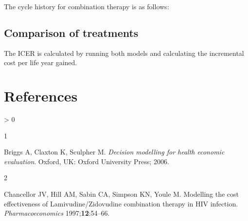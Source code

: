 \documentclass[
]{article}
\newenvironment{Shaded}{\begin{snugshade}}{\end{snugshade}}
\newcommand{\CommentTok}[1]{\textcolor[rgb]{0.56,0.35,0.01}{\textit{#1}}}
\newcommand{\DocumentationTok}[1]{\textcolor[rgb]{0.56,0.35,0.01}{\textbf{\textit{#1}}}}
\newlength{\cslhangindent}
\newlength{\csllabelwidth}
\newenvironment{CSLReferences}[2] %
 {%
  \setlength{\parindent}{0pt}
  \ifodd #1 \everypar{\setlength{\hangindent}{\cslhangindent}}\ignorespaces\fi
  \ifnum #2 > 0
  \setlength{\parskip}{#2\baselineskip}
  \fi
 }%
 {}
\newcommand{\CSLLeftMargin}[1]{\parbox[t]{\csllabelwidth}{#1}}
\newcommand{\CSLRightInline}[1]{\parbox[t]{\linewidth - \csllabelwidth}{#1}\break}
\begin{document}
\begin{Shaded}
\end{Shaded}

The cycle history for combination therapy is as follows:

\hypertarget{comparison-of-treatments}{%
\subsection{Comparison of treatments}\label{comparison-of-treatments}}

The ICER is calculated by running both models and calculating the
incremental cost per life year gained.

\hypertarget{references}{%
\section*{References}\label{references}}

\hypertarget{refs}{}
\begin{CSLReferences}{0}{0}
\leavevmode\hypertarget{ref-briggs2006}{}%
\CSLLeftMargin{1 }
\CSLRightInline{Briggs A, Claxton K, Sculpher M. \emph{Decision
modelling for health economic evaluation}. {Oxford, UK}: {Oxford
University Press}; 2006.}

\leavevmode\hypertarget{ref-chancellor1997}{}%
\CSLLeftMargin{2 }
\CSLRightInline{Chancellor JV, Hill AM, Sabin CA, Simpson KN, Youle M.
Modelling the cost effectiveness of {Lamivudine}/{Zidovudine}
combination therapy in {HIV} infection. \emph{Pharmacoeconomics}
1997;\textbf{12}:54--66.}

\end{CSLReferences}
\end{document}
